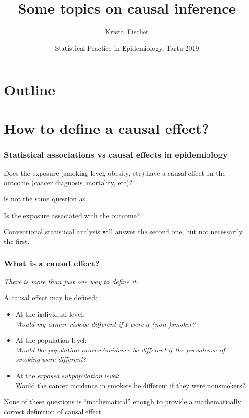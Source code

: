 \documentclass{beamer}
\title{Some topics on causal inference}
\author{Krista~Fischer}
\institute[TY] %
{
  Institute of Mathematics and Statistics, University of Tartu \\
   Estonian Genome Center, Institute of Genomics, University of Tartu
}
\date[Tartu 2019] %
{Statistical Practice in Epidemiology, Tartu 2019}
\begin{document}
\begin{frame}
  \titlepage
\end{frame}

\section*{Outline}
\begin{frame}
\tableofcontents
\end{frame}

\section{How to define a causal effect?}

\begin{frame}
  \frametitle{Statistical associations vs causal effects in epidemiology}
  \begin{block}{}
  Does the exposure (smoking level, obesity, etc) have a \alert<2>{causal effect} on the outcome (cancer diagnosis, mortality, etc)?
  \end{block}
is not the same question as   
 \begin{block}{}
  Is the exposure \alert<3>{associated} with the outcome?
  \end{block}
 Conventional statistical analysis will answer the second one, but not necessarily the first. 
\end{frame}

\begin{frame}
  \frametitle{What is a causal effect?}
  
 \emph{There is more than just one way to define it.}
 
 A causal effect may be defined:
  \begin{itemize}
  \item At the \alert<1>{individual level}: \\
  \alert<1>{\textit{Would my cancer risk be different if I were a (non-)smoker?}}
  \item At the \alert<2>{population level}: \\
  \alert<2>{\textit{Would the population cancer incidence be different if the prevalence of smoking were different?}}
  \item At the \alert<3>{\textit{exposed subpopulation level}}: \\
  \alert<3>{Would the cancer incidence in smokers be different if they were nonsmokers?}
  \end{itemize}
\alert<4>{
None of these questions is ``mathematical'' enough to provide a mathematically correct definition of causal effect 
}
\end{frame}
\end{document}
